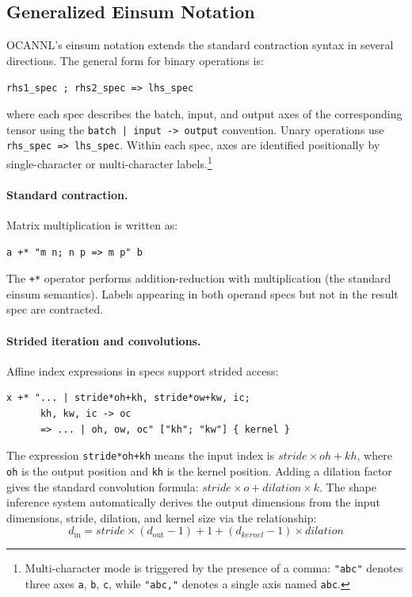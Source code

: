 \documentclass[acmsmall,nonacm,review]{acmart}
\newcommand{\code}[1]{\lstinline[basicstyle=\normalsize\ttfamily]{#1}}
\newcommand{\spec}[1]{\texttt{\small #1}}
\begin{document}
\subsection{Generalized Einsum Notation}
\label{sec:einsum}

OCANNL's einsum notation extends the standard contraction syntax in several
directions. The general form for binary operations is:

\begin{center}
\spec{rhs1\_spec ; rhs2\_spec => lhs\_spec}
\end{center}

\noindent where each spec describes the batch, input, and output axes of the
corresponding tensor using the \spec{batch | input -> output} convention.
Unary operations use \spec{rhs\_spec => lhs\_spec}. Within each spec, axes
are identified positionally by single-character or multi-character
labels.\footnote{Multi-character mode is triggered by the presence of a comma:
\spec{"abc"} denotes three axes \spec{a}, \spec{b}, \spec{c}, while
\spec{"abc,"} denotes a single axis named \spec{abc}.}

\paragraph{Standard contraction.}
Matrix multiplication is written as:
\begin{lstlisting}
a +* "m n; n p => m p" b
\end{lstlisting}
The \code{+*} operator performs addition-reduction with multiplication (the
standard einsum semantics). Labels appearing in both operand specs but not in
the result spec are contracted.

\paragraph{Strided iteration and convolutions.}
Affine index expressions in specs support strided access:
\begin{lstlisting}
x +* "... | stride*oh+kh, stride*ow+kw, ic;
      kh, kw, ic -> oc
      => ... | oh, ow, oc" ["kh"; "kw"] { kernel }
\end{lstlisting}
The expression \spec{stride*oh+kh} means the input index is
$\mathit{stride} \times \mathit{oh} + \mathit{kh}$, where \spec{oh} is the
output position and \spec{kh} is the kernel position. Adding a dilation
factor gives the standard convolution formula:
$\mathit{stride} \times o + \mathit{dilation} \times k$. The shape inference
system automatically derives the output dimensions from the input dimensions,
stride, dilation, and kernel size via the relationship:
\[
  d_{\text{in}} = \mathit{stride} \times (d_{\text{out}} - 1) +
  1 + (\mathit{d_{\text{kernel}}} - 1) \times \mathit{dilation}
\]
\end{document}
